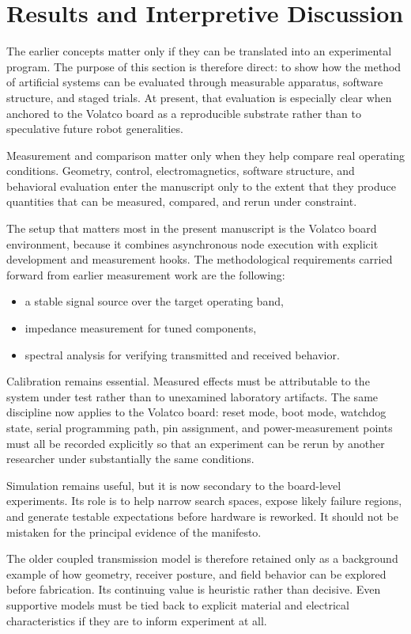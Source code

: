 \documentclass[a4paper,english]{article}
\begin{document}
\section{Results and Interpretive Discussion}

The earlier concepts matter only if they can be translated into an
experimental program. The purpose of this section is therefore direct:
to show how the method of artificial systems can be evaluated through
measurable apparatus, software structure, and staged trials. At present,
that evaluation is especially clear when anchored to the Volatco board
as a reproducible substrate rather than to speculative future robot
generalities.

Measurement and comparison matter only when they help compare
real operating conditions. Geometry, control, electromagnetics, software
structure, and behavioral evaluation enter the manuscript only to
the extent that they produce quantities that can be measured, compared,
and rerun under constraint.

The setup that matters most in the present manuscript is the Volatco
board environment, because it combines asynchronous node execution
with explicit development and measurement hooks. The methodological
requirements carried forward from earlier measurement work are the following:
\begin{itemize}
\item a stable signal source over the target operating band,
\item impedance measurement for tuned components,
\item spectral analysis for verifying transmitted and received behavior.
\end{itemize}
Calibration remains essential. Measured effects must be attributable
to the system under test rather than to unexamined laboratory artifacts.
The same discipline now applies to the Volatco board: reset mode,
boot mode, watchdog state, serial programming path, pin assignment,
and power-measurement points must all be recorded explicitly so that
an experiment can be rerun by another researcher under substantially
the same conditions.

Simulation remains useful, but it is now secondary to the board-level
experiments. Its role is to help narrow search spaces, expose likely
failure regions, and generate testable expectations before hardware
is reworked. It should not be mistaken for the principal evidence
of the manifesto.

The older coupled transmission model is therefore retained only as
a background example of how geometry, receiver posture, and field
behavior can be explored before fabrication. Its continuing value
is heuristic rather than decisive. Even supportive models must be
tied back to explicit material and electrical characteristics if they
are to inform experiment at all.
\end{document}
